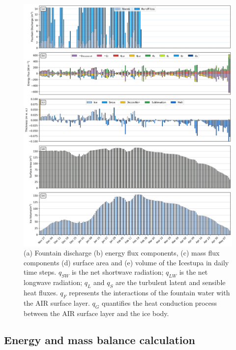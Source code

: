 \documentclass[utf8]{frontiersSCNS} %
\begin{document}
\begin{figure} \begin{center} \includegraphics[width=\linewidth]{Figures/Model_Output_Manual.jpg} \end{center}
\caption{(a) Fountain discharge (b) energy flux components, (c) mass flux components (d) surface area and (e) volume of
  the Icestupa in daily time steps.  $q_{SW}$ is the net shortwave radiation; $q_{LW}$ is the net longwave radiation;
  $q_{L}$ and $q_{S}$ are the turbulent latent and sensible heat fluxes. $q_{F}$ represents the interactions of the
  fountain water with the AIR surface layer.  $q_{G}$ quantifies the heat conduction process between the
  AIR surface layer and the ice body. } \label{fig:EB} \end{figure} \subsection{Energy and mass balance
calculation}
\end{document}
